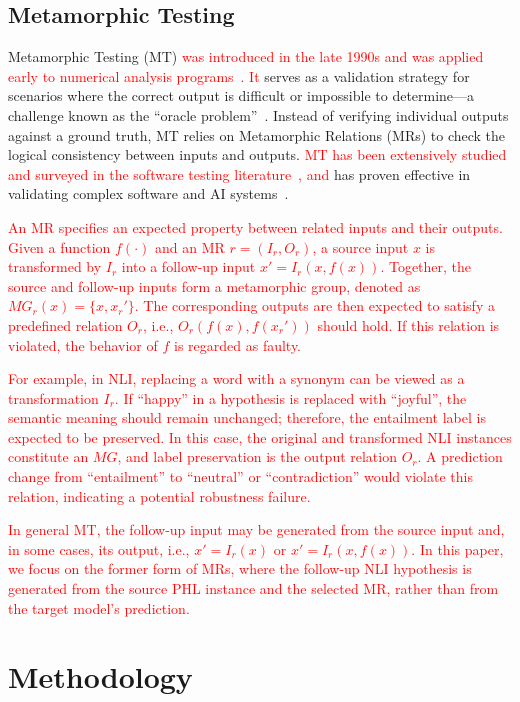 \documentclass[lettersize,journal]{IEEEtran}
\newcommand{\red}[1]{\textcolor{red}{#1}}
\begin{document}
\subsection{Metamorphic Testing}
Metamorphic Testing (MT) \red{was introduced in the late 1990s and was applied early to numerical analysis programs~\cite{8b7afd955e154a4399cf09e02a74d23e}. It} serves as a validation strategy for scenarios where the correct output is difficult or impossible to determine—a challenge known as the ``oracle problem''~\cite{DBLP:journals/corr/abs-2002-12543}. Instead of verifying individual outputs against a ground truth, MT relies on Metamorphic Relations (MRs) to check the logical consistency between inputs and outputs. \red{MT has been extensively studied and surveyed in the software testing literature~\cite{DBLP:journals/csur/ChenKLPTTZ18,DBLP:journals/tse/SeguraFSC16}, and} has proven effective in validating complex software and AI systems~\cite{DBLP:journals/software/SeguraTZC20,Khokhar2020}.

\red{An MR specifies an expected property between related inputs and their outputs. 
Given a function $f(\cdot)$ and an MR $r = (I_r, O_r)$, a source input $x$ is transformed by $I_r$ into a follow-up input $x' = I_r(x, f(x))$. 
Together, the source and follow-up inputs form a metamorphic group, denoted as $MG_r(x)=\{x,x_r'\}$. 
The corresponding outputs are then expected to satisfy a predefined relation $O_r$, i.e., $O_r(f(x), f(x_r'))$ should hold. 
If this relation is violated, the behavior of $f$ is regarded as faulty.}

\red{For example, in NLI, replacing a word with a synonym can be viewed as a transformation $I_r$. 
If ``happy'' in a hypothesis is replaced with ``joyful'', the semantic meaning should remain unchanged; therefore, the entailment label is expected to be preserved. 
In this case, the original and transformed NLI instances constitute an $MG$, and label preservation is the output relation $O_r$. 
A prediction change from ``entailment'' to ``neutral'' or ``contradiction'' would violate this relation, indicating a potential robustness failure.}

\red{In general MT, the follow-up input may be generated from the source input and, in some cases, its output, i.e., $x' = I_r(x)$ or $x' = I_r(x, f(x))$. In this paper, we focus on the former form of MRs, where the follow-up NLI hypothesis is generated from the source PHL instance and the selected MR, rather than from the target model’s prediction.}

\section{Methodology}
\end{document}
